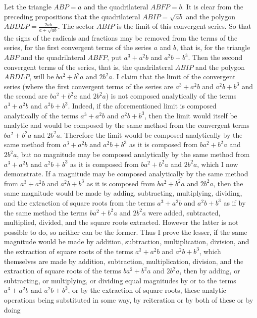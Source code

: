 \documentclass[11pt,letterpaper]{book}
\begin{document}
Let the triangle $ABP = a$ and the quadrilateral $ABFP = b$. It is clear from the
preceding propositions that the quadrilateral $ABIP = \sqrt{ab}$ and the polygon $ABDLP
= \frac{2ab}{a+\sqrt{ab}}$. The sector $ABIP$ is the limit of this convergent
series. So that the signs of the radicals and fractions may be removed from the
terms of the series, for the first convergent terms of the series $a$ and $b$,
that is, for the triangle $ABP$ and the quadrilateral $ABFP$, put $a^{3}+a^{2}b$
and $a^{2}b+b^{3}$. Then the second convergent terms of the series, that is, the
quadrilateral $ABIP$ and the polygon $ABDLP$, will be $ba^{2}+b^{2}a$ and $2b^{2}a$. I
claim that the limit of the convergent series (where the first convergent terms
of the series are $a^{3}+a^{2}b$ and $a^{2}b+b^{3}$ and the second are
$ba^{2}+b^{2}a$ and $2b^{2}a$) is not composed analytically of the terms
$a^{3}+a^{2}b$ and $a^{2}b+b^{3}$. Indeed, if the aforementioned limit is
composed analytically of the terms $a^{3}+a^{2}b$ and $a^{2}b+b^{3}$, then the
limit would itself be analytic and would be composed by the same method from
the convergent terms $ba^{2}+b^{2}a$ and $2b^{2}a$. Therefore the limit would
be composed analytically by the same method from $a^{3}+a^{2}b$ and
$a^{2}b+b^{3}$ as it is composed from $ba^{2}+b^{2}a$ and $2b^{2}a$, but no
magnitude may be composed analytically by the same method from $a^{3}+a^{2}b$
and $a^{2}b+b^{3}$ as it is composed from $ba^{2}+b^{2}a$ and $2b^{2}a$, which
I now demonstrate. If a magnitude may be composed analytically by the same
method from $a^{3}+a^{2}b$ and $a^{2}b+b^{3}$ as it is composed from
$ba^{2}+b^{2}a$ and $2b^{2}a$, then the same magnitude would be made by adding,
subtracting, multiplying, dividing, and the extraction of square roots from the terms
$a^{3}+a^{2}b$ and $a^{2}b+b^{3}$ as if by the same method the terms
$ba^{2}+b^{2}a$ and $2b^{2}a$ were added, subtracted, multiplied, divided, and
the square roots extracted. However the latter is not possible to do, so neither
can be the former. Thus I prove the lesser, if the same magnitude would be made by
addition, subtraction, multiplication, division, and the extraction of square roots of the terms
$a^{3}+a^{2}b$ and $a^{2}b+b^{3}$, which themselves are made by addition,
subtraction, multiplication, division, and the extraction of square roots of the terms
$ba^{2}+b^{2}a$ and $2b^{2}a$, then by adding, or subtracting, or multiplying,
or dividing equal magnitudes by or to the terms $a^{3}+a^{2}b$ and
$a^{2}b+b^{3}$, or by the extraction of square roots, these analytic operations
being substituted in some way, by reiteration or by both of these or by doing
\end{document}
